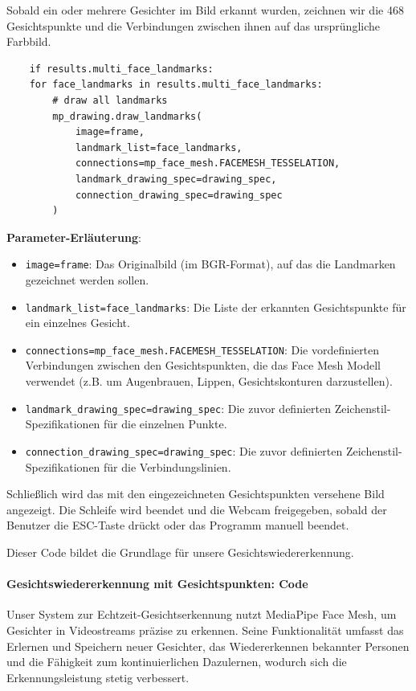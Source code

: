 Sobald ein oder mehrere Gesichter im Bild erkannt wurden, zeichnen wir die 468 Gesichtspunkte und die Verbindungen zwischen ihnen auf das ursprüngliche Farbbild.
\begin{lstlisting}
    if results.multi_face_landmarks:
    for face_landmarks in results.multi_face_landmarks:
        # draw all landmarks
        mp_drawing.draw_landmarks(
            image=frame,
            landmark_list=face_landmarks,
            connections=mp_face_mesh.FACEMESH_TESSELATION,
            landmark_drawing_spec=drawing_spec,
            connection_drawing_spec=drawing_spec
        )
\end{lstlisting}
\textbf{Parameter-Erläuterung}:
\begin{itemize}
    \item \texttt{image=frame}: Das Originalbild (im BGR-Format), auf das die Landmarken gezeichnet werden sollen.
    \item \texttt{landmark\_list=face\_landmarks}: Die Liste der erkannten Gesichtspunkte für ein einzelnes Gesicht.
    \item \texttt{connections=mp\_face\_mesh.FACEMESH\_TESSELATION}: Die vordefinierten Verbindungen zwischen den Gesichtspunkten, die das Face Mesh Modell verwendet (z.B. um Augenbrauen, Lippen, Gesichtskonturen darzustellen).
    \item \texttt{landmark\_drawing\_spec=drawing\_spec}: Die zuvor definierten Zeichenstil-Spezifikationen für die einzelnen Punkte.
    \item \texttt{connection\_drawing\_spec=drawing\_spec}: Die zuvor definierten Zeichenstil-Spezifikationen für die Verbindungslinien.
\end{itemize}

Schließlich wird das mit den eingezeichneten Gesichtspunkten versehene Bild angezeigt. Die Schleife wird beendet und die Webcam freigegeben, sobald der Benutzer die ESC-Taste drückt oder das Programm manuell beendet.

Dieser Code bildet die Grundlage für unsere Gesichtswiedererkennung.

\paragraph{Gesichtswiedererkennung mit Gesichtspunkten: Code}

Unser System zur Echtzeit-Gesichtserkennung nutzt MediaPipe Face Mesh, um Gesichter in Videostreams präzise zu erkennen.
Seine Funktionalität umfasst das Erlernen und Speichern neuer Gesichter, das Wiedererkennen bekannter Personen und die Fähigkeit zum kontinuierlichen Dazulernen, wodurch sich die Erkennungsleistung stetig verbessert.

